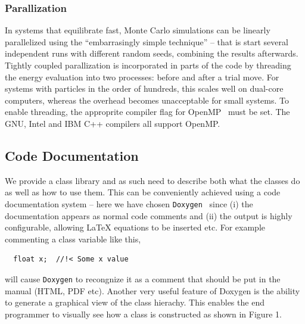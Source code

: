 \documentclass[10pt]{bmc_article}
\newenvironment{bmcformat}{\fussy\setboolean{publ}{true}}{\fussy}
\begin{document}
\begin{bmcformat}
\subsubsection*{Parallization}
In systems that equilibrate fast, Monte Carlo simulations can be linearly parallelized using the ``embarrasingly simple technique'' -- that is start several independent runs with different random seeds, combining the results afterwards.
Tightly coupled parallization is incorporated in parts of the code by threading the energy evaluation into two processes: before and after a trial move.
For systems with particles in the order of hundreds, this scales well on dual-core computers, whereas the overhead becomes unacceptable for small systems. To enable threading, the approprite compiler flag for OpenMP~\cite{openmp:98} must be set. The GNU, Intel and IBM C++ compilers all support OpenMP.

\subsection*{Code Documentation}
We provide a class library and as such need to describe both what the classes do as well as how to use them. This can be conveniently achieved using a code documentation system -- here we have chosen \verb"Doxygen"~\cite{doxygen} since (i) the documentation appears as normal code comments and (ii) the output is highly configurable, allowing LaTeX equations to be inserted etc.
For example commenting a class variable like this,
\begin{verbatim}
  float x;  //!< Some x value
\end{verbatim}
will cause \verb"Doxygen" to recongnize it as a comment that should be put in the manual (HTML, PDF etc). Another very useful feature of Doxygen is the ability to generate a graphical view of the class hierachy. This enables the end programmer to visually see how a class is constructed as shown in Figure 1.



\end{bmcformat}
\end{document}
